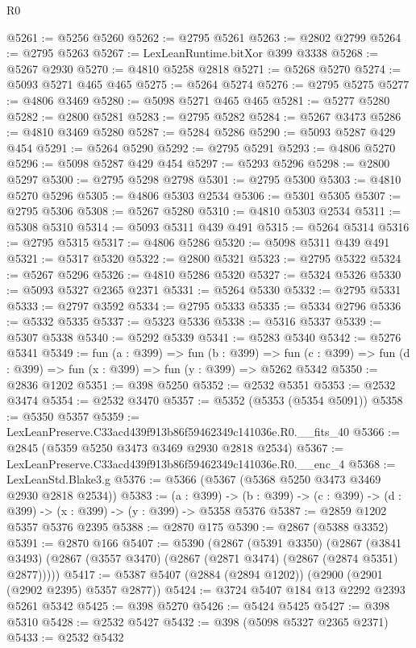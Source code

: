 \begin{lexlean}{R0}
\begin{coremodule}
@5261 := @5256 @5260
@5262 := @2795 @5261
@5263 := @2802 @2799
@5264 := @2795 @5263
@5267 := LexLeanRuntime.bitXor @399 @3338
@5268 := @5267 @2930
@5270 := @4810 @5258 @2818
@5271 := @5268 @5270
@5274 := @5093 @5271 @465 @465
@5275 := @5264 @5274
@5276 := @2795 @5275
@5277 := @4806 @3469
@5280 := @5098 @5271 @465 @465
@5281 := @5277 @5280
@5282 := @2800 @5281
@5283 := @2795 @5282
@5284 := @5267 @3473
@5286 := @4810 @3469 @5280
@5287 := @5284 @5286
@5290 := @5093 @5287 @429 @454
@5291 := @5264 @5290
@5292 := @2795 @5291
@5293 := @4806 @5270
@5296 := @5098 @5287 @429 @454
@5297 := @5293 @5296
@5298 := @2800 @5297
@5300 := @2795 @5298 @2798
@5301 := @2795 @5300
@5303 := @4810 @5270 @5296
@5305 := @4806 @5303 @2534
@5306 := @5301 @5305
@5307 := @2795 @5306
@5308 := @5267 @5280
@5310 := @4810 @5303 @2534
@5311 := @5308 @5310
@5314 := @5093 @5311 @439 @491
@5315 := @5264 @5314
@5316 := @2795 @5315
@5317 := @4806 @5286
@5320 := @5098 @5311 @439 @491
@5321 := @5317 @5320
@5322 := @2800 @5321
@5323 := @2795 @5322
@5324 := @5267 @5296
@5326 := @4810 @5286 @5320
@5327 := @5324 @5326
@5330 := @5093 @5327 @2365 @2371
@5331 := @5264 @5330
@5332 := @2795 @5331
@5333 := @2797 @3592
@5334 := @2795 @5333
@5335 := @5334 @2796
@5336 := @5332 @5335
@5337 := @5323 @5336
@5338 := @5316 @5337
@5339 := @5307 @5338
@5340 := @5292 @5339
@5341 := @5283 @5340
@5342 := @5276 @5341
@5349 := fun (a : @399) =>
  fun (b : @399) =>
  fun (c : @399) => fun (d : @399) => fun (x : @399) => fun (y : @399) => @5262 @5342
@5350 := @2836 @1202
@5351 := @398 @5250
@5352 := @2532 @5351
@5353 := @2532 @3474
@5354 := @2532 @3470
@5357 := @5352 (@5353 (@5354 @5091))
@5358 := @5350 @5357
@5359 := LexLeanPreserve.C33acd439f913b86f59462349c141036e.R0.__fits_40
@5366 := @2845 (@5359 @5250 @3473 @3469 @2930 @2818 @2534)
@5367 := LexLeanPreserve.C33acd439f913b86f59462349c141036e.R0.__enc_4
@5368 := LexLeanStd.Blake3.g
@5376 := @5366 (@5367 (@5368 @5250 @3473 @3469 @2930 @2818 @2534))
@5383 := (a : @399) ->
  (b : @399) -> (c : @399) -> (d : @399) -> (x : @399) -> (y : @399) -> @5358 @5376
@5387 := @2859 @1202 @5357 @5376 @2395
@5388 := @2870 @175
@5390 := @2867 (@5388 @3352)
@5391 := @2870 @166
@5407 := @5390
    (@2867
      (@5391 @3350)
      (@2867 (@3841 @3493) (@2867 (@3557 @3470) (@2867 (@2871 @3474) (@2867 (@2874 @5351) @2877)))))
@5417 := @5387 @5407 (@2884 (@2894 @1202)) (@2900 (@2901 (@2902 @2395) @5357 @2877))
@5424 := @3724 @5407 @184 @13 @2292 @2393 @5261 @5342
@5425 := @398 @5270
@5426 := @5424 @5425
@5427 := @398 @5310
@5428 := @2532 @5427
@5432 := @398 (@5098 @5327 @2365 @2371)
@5433 := @2532 @5432

\end{coremodule}
\end{lexlean}
